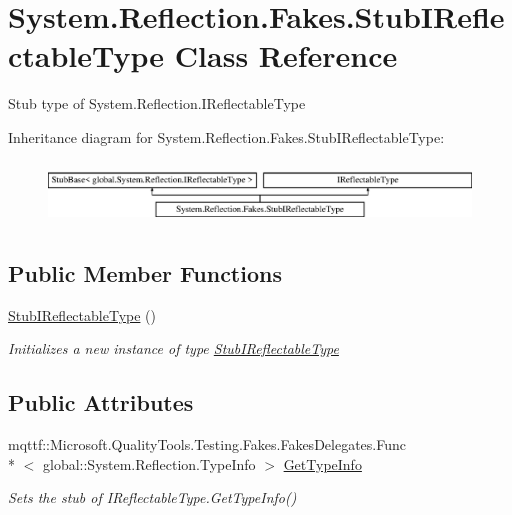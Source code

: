 \hypertarget{class_system_1_1_reflection_1_1_fakes_1_1_stub_i_reflectable_type}{\section{System.\-Reflection.\-Fakes.\-Stub\-I\-Reflectable\-Type Class Reference}
\label{class_system_1_1_reflection_1_1_fakes_1_1_stub_i_reflectable_type}
}


Stub type of System.\-Reflection.\-I\-Reflectable\-Type 


Inheritance diagram for System.\-Reflection.\-Fakes.\-Stub\-I\-Reflectable\-Type\-:\begin{figure}[H]
\begin{center}
\leavevmode
\includegraphics[height=1.681682cm]{class_system_1_1_reflection_1_1_fakes_1_1_stub_i_reflectable_type}
\end{center}
\end{figure}
\subsection*{Public Member Functions}
\begin{DoxyCompactItemize}
\item 
\hyperlink{class_system_1_1_reflection_1_1_fakes_1_1_stub_i_reflectable_type_a0e5a91267bd0835f634dc53a2e7041f6}{Stub\-I\-Reflectable\-Type} ()
\begin{DoxyCompactList}\small\item\em Initializes a new instance of type \hyperlink{class_system_1_1_reflection_1_1_fakes_1_1_stub_i_reflectable_type}{Stub\-I\-Reflectable\-Type}\end{DoxyCompactList}\end{DoxyCompactItemize}
\subsection*{Public Attributes}
\begin{DoxyCompactItemize}
\item 
mqttf\-::\-Microsoft.\-Quality\-Tools.\-Testing.\-Fakes.\-Fakes\-Delegates.\-Func\\*
$<$ global\-::\-System.\-Reflection.\-Type\-Info $>$ \hyperlink{class_system_1_1_reflection_1_1_fakes_1_1_stub_i_reflectable_type_a2f90911050d8526cc1dba270e2942bfa}{Get\-Type\-Info}
\begin{DoxyCompactList}\small\item\em Sets the stub of I\-Reflectable\-Type.\-Get\-Type\-Info()\end{DoxyCompactList}\end{DoxyCompactItemize}


